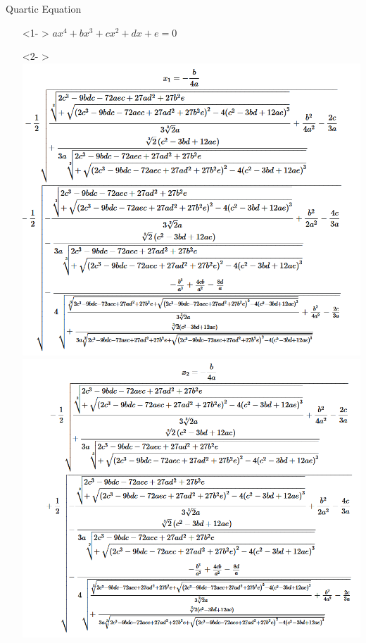 \documentclass[aspectratio=169,xcolor=dvipsnames]{beamer}
\begin{document}
\begin{frame}{Quartic Equation}
    \begin{center}
    \begin{itemize}
        \centering
        \item[] <1- > {$ax^4 + bx^3 + cx^2 + dx + e = 0$}
        \item[] <2- > {
         {\includegraphics[scale=0.3]{images/x1.png}}
         {\includegraphics[scale=0.3]{images/x2.png}}
}
\end{itemize}
\end{center}
\end{frame}
\end{document}
